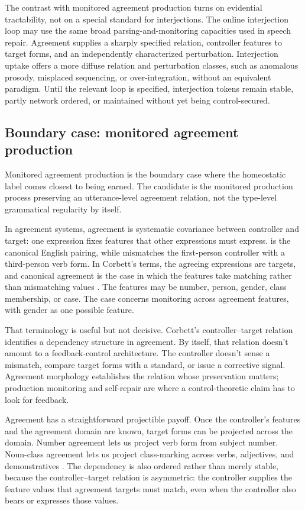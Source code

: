 \documentclass[12pt]{article}
\begin{document}
The contrast with monitored agreement production turns on evidential
tractability, not on a special standard for interjections. The online interjection
loop may use the same broad parsing-and-monitoring capacities used in speech
repair. Agreement supplies a sharply specified relation, controller features to
target forms, and an independently characterized perturbation. Interjection uptake
offers a more diffuse relation and perturbation classes, such as anomalous
prosody, misplaced sequencing, or over-integration, without an equivalent
paradigm. Until the relevant loop is specified, interjection tokens remain stable,
partly network ordered, or maintained without yet being control-secured.

\subsection{Boundary case: monitored agreement production}

Monitored agreement production is the boundary case where the homeostatic label
comes closest to being earned. The candidate is the monitored production process
preserving an utterance-level agreement relation, not the type-level grammatical
regularity by itself.

In agreement systems, agreement is systematic covariance between controller and
target: one expression fixes features that other expressions must express.
 is the canonical English pairing, while 
mismatches the first-person controller with a third-person verb form. In Corbett's
terms, the agreeing expressions are targets, and canonical agreement is the case
in which the features take matching rather than mismatching values
\citep{corbett2006}. The features may be number, person, gender, class
membership, or case. The case concerns monitoring across agreement features, with
gender as one possible feature.

That terminology is useful but not decisive. Corbett's controller--target relation
identifies a dependency structure in agreement. By itself, that relation doesn't
amount to a feedback-control architecture. The controller doesn't sense a
mismatch, compare target forms with a standard, or issue a corrective signal.
Agreement morphology establishes the relation whose preservation matters;
production monitoring and self-repair are where a control-theoretic claim has to
look for feedback.

Agreement has a straightforward projectible payoff. Once the controller's features
and the agreement domain are known, target forms can be projected across the
domain. Number agreement lets us project verb form from subject number. Noun-class
agreement lets us project class-marking across verbs, adjectives, and demonstratives
\citep{ashton1947,corbett2006}. The dependency is also ordered rather than merely
stable, because the controller--target relation is asymmetric: the controller
supplies the feature values that agreement targets must match, even when the
controller also bears or expresses those values.
\end{document}
